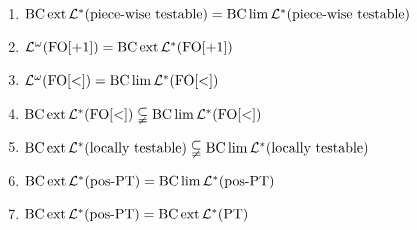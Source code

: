 \documentclass[a4,notes]{seminar}
\begin{document}
\begin{slide}
\begin{enumerate}
\item $ \BC \ext \Lang^* (\PT) = \BC \lim \Lang^* (\PT) $
\item $ \Lang^\omega (\mathrm{FO[+1]}) = \BC \ext \Lang^*(\mathrm{FO[+1]}) $
\item $ \Lang^\omega (\mathrm{FO[<]}) = \BC \lim \Lang^*(\mathrm{FO[<]}) $
\item $ \BC \ext \Lang^*( \mathrm{FO[<]} ) \subsetneqq \BC \lim \Lang^* ( \mathrm{FO[<]} )  $
\item $ \BC \ext \Lang^* (\LT) \subsetneqq \BC \lim \Lang^*(\LT) $
\item $ \BC \ext \Lang^* (\mathtext{pos-PT}) = \BC \lim \Lang^* (\mathtext{pos-PT}) $
\item $ \BC \ext \Lang^*(\mathtext{pos-PT}) = \BC \ext \Lang^* (\mathtext{PT}) $
\end{enumerate}
\end{slide}
\end{document}
